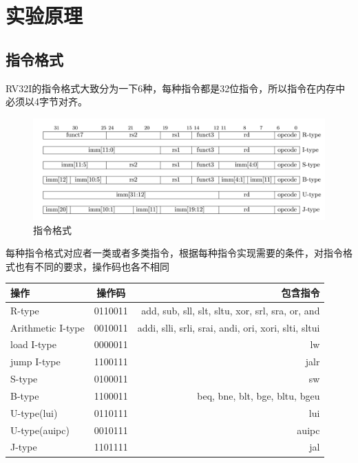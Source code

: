 
\section{实验原理}
\subsection{指令格式}
RV32I的指令格式大致分为一下6种，每种指令都是32位指令，所以指令在内存中必须以4字节对齐。\\

\begin{figure}[H] %
    \centering %
    \includegraphics[width=1.0\textwidth]{指令格式.png} %
    \caption{指令格式} %
    \label{Fig.1} %
\end{figure}

每种指令格式对应者一类或者多类指令，根据每种指令实现需要的条件，对指令格式也有不同的要求，操作码也各不相同 \\

\begin{tabular}{|l|c|r|}
    \hline
    操作 & 操作码& 包含指令\\
    \hline
    R-type & 0110011 & add, sub, sll, slt, sltu, xor, srl, sra, or, and \\
    \hline
    Arithmetic I-type & 0010011 & addi,  slli, srli, srai, andi, ori, xori, slti, sltui \\
    \hline
    load I-type & 0000011 & lw \\
    \hline
    jump I-type & 1100111 & jalr \\
    \hline
    S-type & 0100011 & sw \\
    \hline 
    B-type & 1100011 & beq, bne, blt, bge, bltu, bgeu \\
    \hline
    U-type(lui) & 0110111 & lui \\
    \hline
    U-type(auipc) & 0010111 & auipc \\
    \hline
    J-type & 1101111 & jal \\
    \hline
\end{tabular} \\

